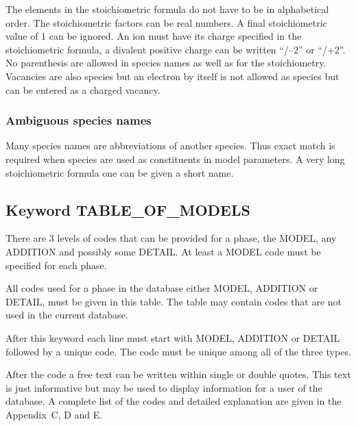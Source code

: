 \documentclass[12pt]{article}
\begin{document}
The elements in the stoichiometric formula do not have to be in
alphabetical order.  The stoichiometric factors can be real numbers.
A final stoichiometric value of 1 can be ignored.  An ion must have
its charge specified in the stoichiometric formula, a divalent
positive charge can be written ``/--2'' or ``/+2''.  No parenthesis
are allowed in species names as well as for the stoichiometry.
Vacancies are also species but an electron by itself is not allowed as
species but can be entered as a charged vacancy.

\subsubsection{Ambiguous species names}\label{sec:spnames}

Many species names are abbreviations of another species.  Thus exact
match is required when species are used as constituents in model
parameters.  A very long stoichiometric formula one can be given a
short name.

\subsection{Keyword TABLE\_OF\_MODELS}

There are 3 levels of codes that can be provided for a phase, the
MODEL, any ADDITION and possibly some DETAIL.  At least a MODEL code
must be specified for each phase.

All codes used for a phase in the database either MODEL, ADDITION or
DETAIL, must be given in this table.  The table may contain codes
that are not used in the current database.

After this keyword each line must start with MODEL, ADDITION or DETAIL
followed by a unique code.  The code must be unique among all of the
three types.

After the code a free text can be written within single or double
quotes.  This text is just informative but may be used to display
information for a user of the database.  A complete list of the codes
and detailed explanation are given in the Appendix~C, D and E.
\end{document}
